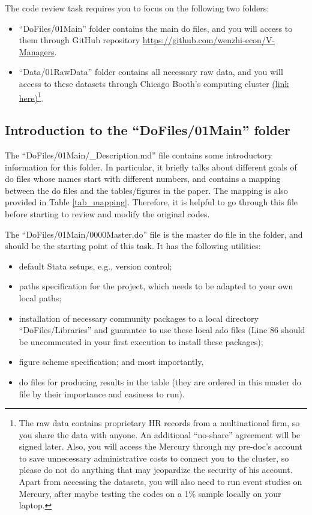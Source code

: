 \documentclass[12pt]{article}
\newcommand{\highlightP}[1]{{\emph{\color{MyPink}{#1}}}}
\theoremstyle{definition}
\begin{document}
The code review task requires you to focus on the following two folders:
\begin{itemize}[topsep=0pt, leftmargin=20pt, itemsep=0pt]
	\setlength{\parskip}{10pt} 
	\item ``DoFiles/01Main'' folder contains the main do files, and you will access to them through GitHub repository \href{https://github.com/wenzhi-econ/V-Managers}{https://github.com/wenzhi-econ/V-Managers}.
	\item ``Data/01RawData'' folder contains all necessary raw data, and you will access to these datasets through Chicago Booth's computing cluster \href{https://hpc-docs.chicagobooth.edu/intro.html}{(link here)}\footnote{The raw data contains proprietary HR records from a multinational firm, so you \highlightP{must not} share the data with anyone. An additional ``no-share'' agreement will be signed later. Also, you will access the Mercury through my pre-doc's account to save unnecessary administrative costs to connect you to the cluster, so please do not do anything that may jeopardize the security of his account. Apart from accessing the datasets, you will also need to run event studies on Mercury, after maybe testing the codes on a 1\% sample locally on your laptop.}.
\end{itemize}

\subsection{Introduction to the ``DoFiles/01Main'' folder}

The ``DoFiles/01Main/\_Description.md'' file contains some introductory information for this folder. In particular, it briefly talks about different goals of do files whose names start with different numbers, and contains a mapping between the do files and the tables/figures in the paper. The mapping is also provided in Table \ref{tab_mapping}. Therefore, it is helpful to go through this file before starting to review and modify the original codes.

The ``DoFiles/01Main/0000Master.do'' file is the master do file in the folder, and should be the starting point of this task. It has the following utilities:
\begin{itemize}[topsep=0pt, leftmargin=20pt, itemsep=0pt]
	\setlength{\parskip}{10pt} 
	\item default Stata setups, e.g., version control;
	\item paths specification for the project, which needs to be adapted to your own local paths;
	\item installation of necessary community packages to a local directory ``DoFiles/Libraries'' and guarantee to use these local ado files (Line 86 should be uncommented in your first execution to install these packages);
	\item figure scheme specification; and most importantly,
	\item do files for producing results in the table (they are ordered in this master do file by their importance and easiness to run).
\end{itemize}
\end{document}
